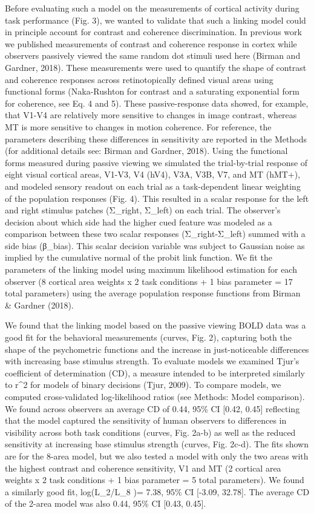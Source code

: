 \documentclass{report}
\begin{document}
Before evaluating such a model on the measurements of cortical activity during task performance (Fig. 3), we wanted to validate that such a linking model could in principle account for contrast and coherence discrimination. In previous work we published measurements of contrast and coherence response in cortex while observers passively viewed the same random dot stimuli used here (Birman and Gardner, 2018). These measurements were used to quantify the shape of contrast and coherence responses across retinotopically defined visual areas using functional forms (Naka-Rushton for contrast and a saturating exponential form for coherence, see Eq. 4 and 5). These passive-response data showed, for example, that V1-V4 are relatively more sensitive to changes in image contrast, whereas MT is more sensitive to changes in motion coherence. For reference, the parameters describing these differences in sensitivity are reported in the Methods (for additional details see: Birman and Gardner, 2018). Using the functional forms measured during passive viewing we simulated the trial-by-trial response of eight visual cortical areas, V1-V3, V4 (hV4), V3A, V3B, V7, and MT (hMT+), and modeled sensory readout on each trial as a task-dependent linear weighting of the population responses (Fig. 4). This resulted in a scalar response for the left and right stimulus patches (Σ_right, Σ_left) on each trial. The observer’s decision about which side had the higher cued feature was modeled as a comparison between these two scalar responses (Σ_right-Σ_left) summed with a side bias (β_bias). This scalar decision variable was subject to Gaussian noise as implied by the cumulative normal of the probit link function. We fit the parameters of the linking model using maximum likelihood estimation for each observer (8 cortical area weights x 2 task conditions + 1 bias parameter = 17 total parameters) using the average population response functions from Birman & Gardner (2018). 

We found that the linking model based on the passive viewing BOLD data was a good fit for the behavioral measurements (curves, Fig. 2), capturing both the shape of the psychometric functions and the increase in just-noticeable differences with increasing base stimulus strength. To evaluate models we examined Tjur’s coefficient of determination (CD), a measure intended to be interpreted similarly to r^2 for models of binary decisions (Tjur, 2009). To compare models, we computed cross-validated log-likelihood ratios (see Methods: Model comparison). We found across observers an average CD of 0.44, 95\% CI [0.42, 0.45] reflecting that the model captured the sensitivity of human observers to differences in visibility across both task conditions (curves, Fig. 2a-b) as well as the reduced sensitivity at increasing base stimulus strength (curves, Fig. 2c-d). The fits shown are for the 8-area model, but we also tested a model with only the two areas with the highest contrast and coherence sensitivity, V1 and MT (2 cortical area weights x 2 task conditions + 1 bias parameter = 5 total parameters). We found a similarly good fit, log⁡(L_2/L_8 )= 7.38, 95\% CI [-3.09, 32.78]. The average CD of the 2-area model was also 0.44, 95\% CI [0.43, 0.45].
\end{document}
